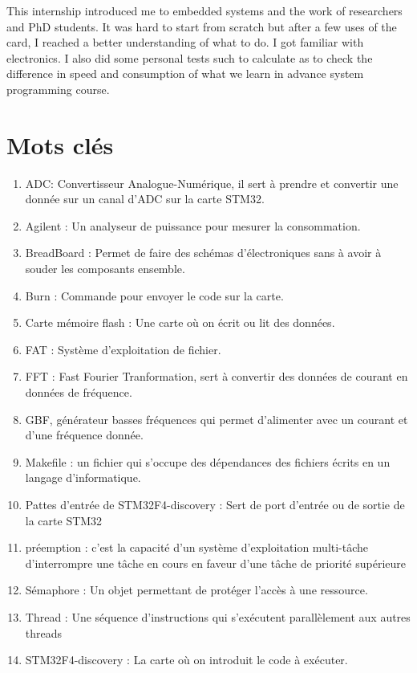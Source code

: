 \documentclass[a4paper]{article}
\begin{document}
This internship introduced me to embedded systems and the work of researchers and PhD students. It was hard to start from scratch but after a few uses of the card, I reached a better understanding of what to do. I got familiar with electronics. I also did some personal tests such to calculate as to check the difference in speed and consumption of what we learn in advance system programming course.

\section{Mots clés}

\begin{enumerate}
\item ADC: Convertisseur Analogue-Numérique, il sert à prendre et convertir une donnée sur un canal d'ADC sur la carte STM32.  
\item Agilent : Un analyseur de puissance pour mesurer la consommation. 
\item BreadBoard : Permet de faire des schémas d'électroniques sans à avoir à souder les composants ensemble.
\item Burn : Commande pour envoyer le code sur la carte.
\item Carte mémoire flash : Une carte où on écrit ou lit des données.
\item FAT : Système d'exploitation de fichier.
\item FFT : Fast Fourier Tranformation, sert à convertir des données de courant en données de fréquence. 
\item GBF, générateur basses fréquences qui permet d'alimenter avec un courant et d'une fréquence donnée. 
\item Makefile : un fichier qui s'occupe des dépendances des fichiers écrits en un langage d'informatique.
\item Pattes d'entrée de STM32F4-discovery : Sert de port d'entrée ou de sortie de la carte STM32
\item préemption : c'est la capacité d'un système d'exploitation multi-tâche d'interrompre une tâche en cours en faveur d'une tâche de priorité supérieure
\item Sémaphore : Un objet permettant de protéger l'accès à une ressource. 
\item Thread : Une séquence d'instructions qui s'exécutent parallèlement aux autres threads
\item STM32F4-discovery : La carte où on introduit le code à exécuter.

\end{enumerate}
\end{document}
